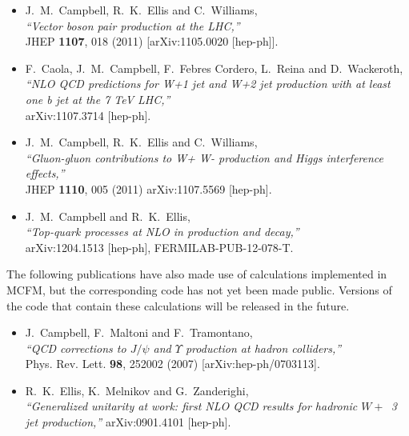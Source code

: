 \documentclass[12pt]{article}
\begin{document}
\begin{itemize}
{  W-boson including decay correlations,''} \\
 JHEP {\bf 1103}, 027 (2011)
  [arXiv:1011.6647 [hep-ph]].
\item J.~M.~Campbell, R.~K.~Ellis and C.~Williams, \\
  {\it ``Vector boson pair production at the LHC,''} \\
  JHEP {\bf 1107}, 018 (2011)
  [arXiv:1105.0020 [hep-ph]]. 
\item F.~Caola, J.~M.~Campbell, F.~Febres Cordero, L.~Reina and D.~Wackeroth, \\
  {\it ``NLO QCD predictions for W+1 jet and W+2 jet production with at least one b
  jet at the 7 TeV LHC,''} \\
  arXiv:1107.3714 [hep-ph].
\item J.~M.~Campbell, R.~K.~Ellis and C.~Williams, \\
  {\it ``Gluon-gluon contributions to W+ W- production and Higgs interference
  effects,''} \\
  JHEP {\bf 1110}, 005 (2011)
  arXiv:1107.5569 [hep-ph].
\item J.~M.~Campbell and R.~K.~Ellis, \\
  {\it ``Top-quark processes at NLO in production and decay,''} \\
  arXiv:1204.1513 [hep-ph], FERMILAB-PUB-12-078-T.
\end{itemize}

The following publications have also made use of calculations
implemented in MCFM, but the corresponding code has not yet been made
public. Versions of the code that contain these calculations will be
released in the future.

\begin{itemize}
\item J.~Campbell, F.~Maltoni and F.~Tramontano, \\
  {\it ``QCD corrections to $J/\psi$ and $\Upsilon$ production
  at hadron colliders,''} \\
  Phys. Rev. Lett. {\bf 98}, 252002 (2007)
  [arXiv:hep-ph/0703113].
\item R.~K.~Ellis, K.~Melnikov and G.~Zanderighi,\\
  {\it ``Generalized unitarity at work: first NLO QCD results for hadronic $W+$~3 jet production,''}
  arXiv:0901.4101 [hep-ph].
\end{itemize}

\clearpage
\end{document}
